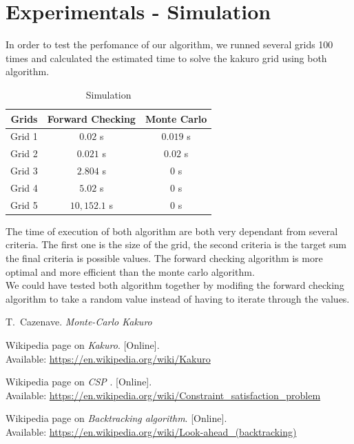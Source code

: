 \documentclass[journal, a4paper]{IEEEtran}
\begin{document}
\section{Experimentals - Simulation}
In order to test the perfomance of our algorithm, we runned several grids 100 times and calculated the estimated time to solve the kakuro grid using both algorithm. 

    \begin{table}[!hbt]
        \begin{center}
        \caption{Simulation}
        \label{tab:simParameters}
        \begin{tabular}{|c|c|c|}
            \hline
           Grids & Forward Checking &  Monte Carlo \\
            \hline
           Grid 1& $0.02$ s  &  $ 0.019 $ s  \\
            \hline
           Grid 2 & $0.021$ s  &  $ 0.02 $ s  \\
            \hline
           Grid 3 & $ 2.804  $ s  &  $ 0 $ s  \\
            \hline
           Grid 4 & $5.02$ s  &  $ 0 $ s  \\
            \hline
           Grid 5 & $ 10,152.1$ s  &  $ 0 $ s  \\
            \hline
        \end{tabular}
        \end{center}
    \end{table}
The time of execution of both algorithm are both very dependant from several criteria. The first one is the size of the grid, the second criteria is the target sum the final criteria is possible values.
The forward checking algorithm is more optimal and more efficient than the monte carlo algorithm. \\
We could have tested both algorithm together by modifing the forward checking algorithm to take a random value instead of having to iterate through the values.

\begin{thebibliography}{5}
    T.~Cazenave. {\em Monte-Carlo Kakuro}

   Wikipedia page on {\em Kakuro}. [Online]. \\ Available:  \url{ https://en.wikipedia.org/wiki/Kakuro}

   Wikipedia page on {\em CSP }. [Online]. \\ Available:  \url{https://en.wikipedia.org/wiki/Constraint_satisfaction_problem}

   Wikipedia page on {\em Backtracking algorithm}. [Online]. \\ Available:  \url{https://en.wikipedia.org/wiki/Look-ahead_(backtracking)}

\end{thebibliography}
\end{document}
